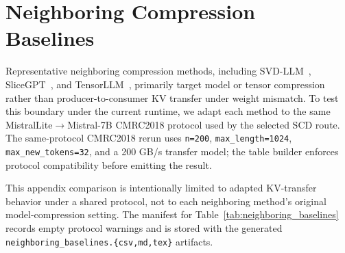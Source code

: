 \documentclass{article}
\theoremstyle{plain}
\theoremstyle{definition}
\theoremstyle{remark}
\begin{document}
\section{Neighboring Compression Baselines}
\label{sec:neighboring_baselines}

Representative neighboring compression methods, including SVD-LLM~\citep{wang2025svdllm}, SliceGPT~\citep{ashkboos2024slicegpt}, and TensorLLM~\citep{gu2025tensorllm}, primarily target model or tensor compression rather than producer-to-consumer KV transfer under weight mismatch.  To test this boundary under the current runtime, we adapt each method to the same MistralLite$\to$Mistral-7B CMRC2018 protocol used by the selected SCD route.  The same-protocol CMRC2018 rerun uses \texttt{n=200}, \texttt{max\_length=1024}, \texttt{max\_new\_tokens=32}, and a 200 GB/s transfer model; the table builder enforces protocol compatibility before emitting the result.

\begin{table}[H]
  \centering
  \footnotesize
  \setlength{\abovecaptionskip}{2pt}
  \setlength{\belowcaptionskip}{2pt}
  \caption{\textbf{Adapted neighboring compression baselines.}
  The adapted neighboring methods collapse under producer-to-consumer weight mismatch, while SCD preserves CMRC2018 F1 and reduces TTFT under the same protocol.}
  \label{tab:neighboring_baselines}
  \renewcommand{\arraystretch}{0.9}
\end{table}

This appendix comparison is intentionally limited to adapted KV-transfer behavior under a shared protocol, not to each neighboring method's original model-compression setting.  The manifest for Table~\ref{tab:neighboring_baselines} records empty protocol warnings and is stored with the generated \texttt{neighboring\_baselines.\{csv,md,tex\}} artifacts.
\end{document}

